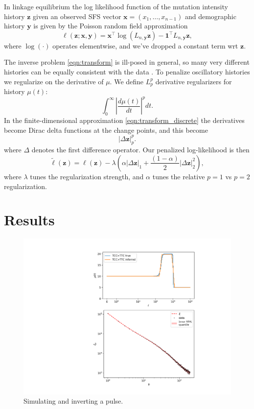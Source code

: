\documentclass[11pt]{article}
\begin{document}
In linkage equilibrium the log likelihood function of the mutation intensity history $\boldsymbol z$ given an observed SFS vector $\boldsymbol x = (x_1,\dots,x_{n-1})$ and demographic history $\boldsymbol y$ is given by the Poisson random field approximation \citep{}
\[
\ell(\boldsymbol z; \boldsymbol x, \boldsymbol y) = \boldsymbol x^\intercal\log(L_{n, \boldsymbol y} \boldsymbol z) - \boldsymbol 1^\intercal L_{n, \boldsymbol y} \boldsymbol z,
\]
where $\log(\cdot)$ operates elementwise, and we've dropped a constant term wrt $\boldsymbol z$.

The inverse problem \eqref{eqn:transform} is ill-posed in general, so many very different histories can be equally consistent with the data \citep{oscillation paper? Yun's other papers?}.
To penalize oscillatory histories we regularize on the derivative of $\mu$.
We define $L_p^p$ derivative regularizers for history $\mu(t)$:
\[
\int_0^\infty\left|\frac{d\mu(t)}{dt}\right|^p dt.
\]
In the finite-dimensional approximation \eqref{eqn:transform_discrete} the derivatives become Dirac delta functions at the change points, and this become
\[
\left|\Delta\boldsymbol z\right|_p^p.
\]
where $\Delta$ denotes the first difference operator.
Our penalized log-likelihood is then
\begin{equation}
\label{eqn:penalized}
\tilde\ell(\boldsymbol z) = \ell(\boldsymbol z) - \lambda \left(\alpha\left|\Delta\boldsymbol z\right|_1 + \frac{(1-\alpha)}{2}\left|\Delta\boldsymbol z\right|_2^2\right),
\end{equation}
where $\lambda$ tunes the regularization strength, and $\alpha$ tunes the relative $p=1$ vs $p=2$ regularization.


\section*{Results}\label{sec:results}


\begin{figure}
  \centering
  \includegraphics[width=.7\textwidth]{figures/fit_teaser}
  \caption{Simulating and inverting a pulse.}
  \label{}
\end{figure}
\end{document}
